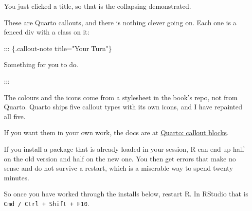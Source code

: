\documentclass[
  letterpaper,
  justified,
  a4paper]{tufte-book}
\makeatletter
\newenvironment{Shaded}{\begin{snugshade}}{\end{snugshade}}
\newcommand{\NormalTok}[1]{\textcolor[rgb]{0.00,0.23,0.31}{#1}}
\let\rbporigShaded\Shaded
\let\rbporigendShaded\endShaded
\renewenvironment{Shaded}{%
  \begingroup
  \ifdim\linewidth=\rbpbodywidth
    \advance\linewidth by \@tufte@overhang
    \advance\hsize by \@tufte@overhang
    \advance\columnwidth by \@tufte@overhang
  \fi
  \rbporigShaded
}{%
  \rbporigendShaded
  \endgroup
}
\makeatother
\begin{document}
\begin{tcolorbox}[enhanced jigsaw, arc=.35mm, bottomrule=.15mm, bottomtitle=1mm, breakable, colback=white, colbacktitle=quarto-callout-tip-color!10!white, colframe=quarto-callout-tip-color-frame, coltitle=black, left=2mm, leftrule=.75mm, opacityback=0, opacitybacktitle=0.6, rightrule=.15mm, title=\textcolor{quarto-callout-tip-color}{\faLightbulb}\hspace{0.5em}{Going deeper: how these boxes are made}, titlerule=0mm, toprule=.15mm, toptitle=1mm]

You just clicked a title, so that is the collapsing demonstrated.

These are Quarto callouts, and there is nothing clever going on. Each
one is a fenced div with a class on it:

\begin{Shaded}
\begin{Highlighting}[]
\NormalTok{::: \{.callout{-}note title="Your Turn"\}}

\NormalTok{Something for you to do.}

\NormalTok{:::}
\end{Highlighting}
\end{Shaded}

The colours and the icons come from a stylesheet in the book's repo, not
from Quarto. Quarto ships five callout types with its own icons, and I
have repainted all five.

If you want them in your own work, the docs are at
\href{https://quarto.org/docs/authoring/callouts.html}{Quarto: callout
blocks}.

\end{tcolorbox}

\begin{tcolorbox}[enhanced jigsaw, arc=.35mm, bottomrule=.15mm, bottomtitle=1mm, breakable, colback=white, colbacktitle=quarto-callout-important-color!10!white, colframe=quarto-callout-important-color-frame, coltitle=black, left=2mm, leftrule=.75mm, opacityback=0, opacitybacktitle=0.6, rightrule=.15mm, title=\textcolor{quarto-callout-important-color}{\faExclamation}\hspace{0.5em}{Restart R after a big install}, titlerule=0mm, toprule=.15mm, toptitle=1mm]

If you install a package that is already loaded in your session, R can
end up half on the old version and half on the new one. You then get
errors that make no sense and do not survive a restart, which is a
miserable way to spend twenty minutes.

So once you have worked through the installs below, restart R. In
RStudio that is \texttt{Cmd\ /\ Ctrl\ +\ Shift\ +\ F10}.

\end{tcolorbox}
\end{document}
